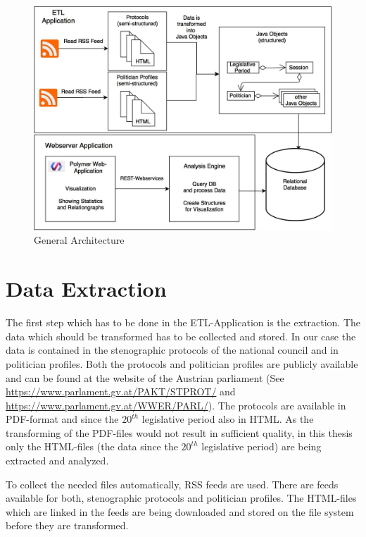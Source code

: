 \begin{figure}
	\centering
	\includegraphics[width=\textwidth]{imgs/overall_architecture}
	\caption{General Architecture}
	\label{fig:general_architecture}
\end{figure}

\section{Data Extraction}
\label{sec:data_extraction}
The first step which has to be done in the ETL-Application is the extraction. The data which should be transformed has to be collected and stored. In our case the data is contained in the stenographic protocols of the national council and in politician profiles. Both the protocols and politician profiles are publicly available and can be found at the website of the Austrian parliament (See \url{https://www.parlament.gv.at/PAKT/STPROT/} and \url{https://www.parlament.gv.at/WWER/PARL/}). The protocols are available in PDF-format and since the $20^{th}$ legislative period also in HTML. As the transforming of the PDF-files would not result in sufficient quality, in this thesis only the HTML-files (the data since the $20^{th}$ legislative period) are being extracted and analyzed.

To collect the needed files automatically, RSS feeds are used. There are feeds available for both, stenographic protocols and politician profiles. The HTML-files which are linked in the feeds are being downloaded and stored on the file system before they are transformed.

